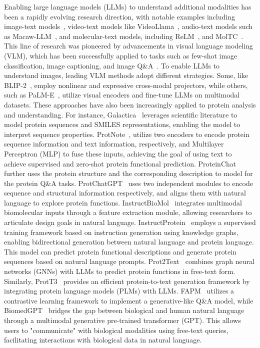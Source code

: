 Enabling large language models (LLMs) to understand additional modalities has been a rapidly evolving research direction, with notable examples including image-text models~\cite{tsimpoukelli2021multimodal,li2023blip}, video-text models like VideoLlama~\cite{zhang2023video}, audio-text models such as Macaw-LLM~\cite{lyu2023macaw}, and molecular-text models, including ReLM~\cite{shi2023relm}, and MolTC~\cite{fang2024moltc}. This line of research was pioneered by advancements in visual language modeling (VLM), which has been successfully applied to tasks such as few-shot image classification, image captioning, and image Q\&A~\cite{li2023blip,alayrac2022flamingo}.
To enable LLMs to understand images, leading VLM methods adopt different strategies. Some, like BLIP-2~\cite{li2023blip}, employ nonlinear and expressive cross-modal projectors, while others, such as PaLM-E~\cite{driess2023palm}, utilize visual encoders and fine-tune LLMs on multimodal datasets. These approaches have also been increasingly applied to protein analysis and understanding. For instance, Galactica~\cite{taylor2022galactica} leverages scientific literature to model protein sequences and SMILES representations, enabling the model to interpret sequence properties. 
ProtNote~\cite{char2024protnote}, utilize two encoders to encode protein sequence information and text information, respectively, and Multilayer Perceptron (MLP) to fuse these inputs, achieving the goal of using text to achieve supervised and zero-shot protein functional prediction. 
ProteinChat~\cite{guo2023proteinchat} further uses the protein structure and the corresponding description to model for the protein Q\&A tasks.
ProtChatGPT~\cite{wang2024protchatgpt} uses two independent modules to encode sequence and structural information respectively, and aligns them with natural language to explore protein functions. 
InstructBioMol~\cite{zhuang2024instructbiomol} integrates multimodal biomolecular inputs through a feature extraction module, allowing researchers to articulate design goals in natural language. 
InstructProtein~\cite{wang2023instructprotein} employs a supervised training framework based on instruction generation using knowledge graphs, enabling bidirectional generation between natural language and protein language. This model can predict protein functional descriptions and generate protein sequences based on natural language prompts. Prot2Text~\cite{abdine2024prot2text} combines graph neural networks (GNNs) with LLMs to predict protein functions in free-text form. Similarly, ProtT3~\cite{liu2024prott3} provides an efficient protein-to-text generation framework by integrating protein language models (PLMs) with LLMs. FAPM~\cite{xiang2024fapm} utilizes a contrastive learning framework to implement a generative-like Q\&A model, while BiomedGPT~\cite{luo2023biomedgpt} bridges the gap between biological and human natural language through a multimodal generative pre-trained transformer (GPT). This allows users to "communicate" with biological modalities using free-text queries, facilitating interactions with biological data in natural language. 



